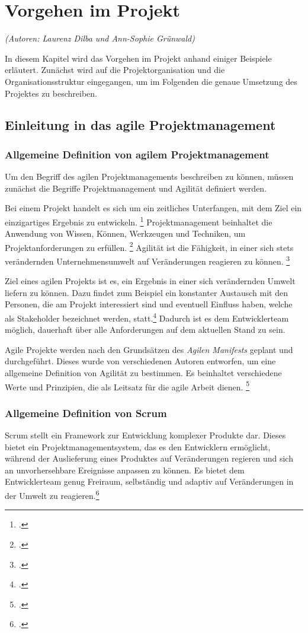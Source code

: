\section{Vorgehen im Projekt}
\textit{(Autoren: Laurenz Dilba und Ann-Sophie Grünwald)}

In diesem Kapitel wird das Vorgehen im Projekt anhand einiger Beispiele erläutert. Zunächst wird auf die Projektorganisation und die Organisationsstruktur eingegangen, um im Folgenden die genaue Umsetzung des Projektes zu beschreiben. 

\subsection{Einleitung in das agile Projektmanagement}
\subsubsection{Allgemeine Definition von agilem Projektmanagement}
Um den Begriff des agilen Projektmanagements beschreiben zu können, müssen zunächst die Begriffe \glqq Projektmanagement\grqq{} und \glqq Agilität\grqq{} definiert werden. 

Bei einem Projekt handelt es sich um ein zeitliches Unterfangen, mit dem Ziel ein einzigartiges Ergebnis zu entwickeln. \footcite[Seite 9]{Brandstäter2013} %
Projektmanagement beinhaltet die Anwendung von Wissen, Können, Werkzeugen und Techniken, um Projektanforderungen zu erfüllen. \footcite[Seite 9]{Brandstäter2013}
Agilität ist die Fähigkeit, in einer sich stets verändernden Unternehmensumwelt auf Veränderungen reagieren zu können. \footcite[Seite 9]{Brandstäter2013}

Ziel eines agilen Projekts ist es, ein Ergebnis in einer sich verändernden Umwelt liefern zu können. Dazu findet zum Beispiel ein konstanter Austausch mit den Personen, die am Projekt interessiert sind und eventuell Einfluss haben, welche als Stakeholder bezeichnet werden, statt.\footcite[Seite 9]{Brandstäter2013} Dadurch ist es dem Entwicklerteam möglich, dauerhaft über alle Anforderungen auf dem aktuellen Stand zu sein.

Agile Projekte werden nach den Grundsätzen des \textit{Agilen Manifests} geplant und durchgeführt. Dieses wurde von verschiedenen Autoren entworfen, um eine allgemeine Definition von Agilität zu bestimmen. Es beinhaltet verschiedene Werte und Prinzipien, die als Leitsatz für die agile Arbeit dienen. \footcite[Seite 9]{Brandstäter2013}

\subsubsection{Allgemeine Definition von Scrum}
Scrum stellt ein Framework zur Entwicklung komplexer Produkte dar. Dieses bietet ein Projektmanagementsystem, das es den Entwicklern ermöglicht, während der Auslieferung eines Produktes auf Veränderungen regieren  und sich an unvorhersehbare Ereignisse anpassen zu können. Es bietet dem Entwicklerteam genug Freiraum, selbständig und adaptiv auf Veränderungen in der Umwelt zu reagieren.\footcite[Seite 11]{Brandstäter2013}


